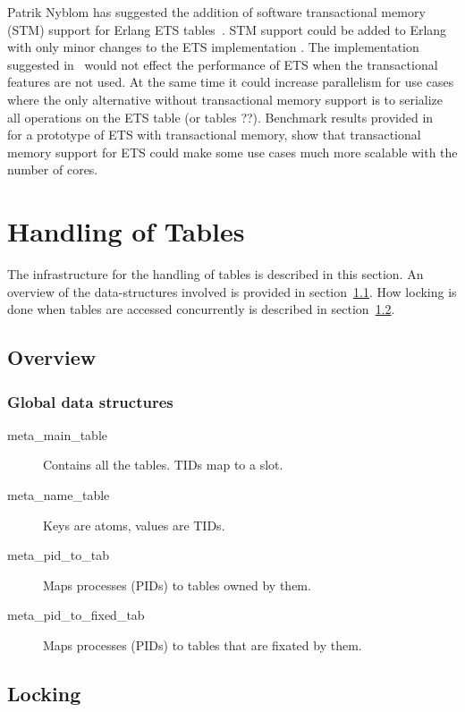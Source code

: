 \documentclass[aps,pre,preprint,nofootinbib]{revtex4}
\begin{document}
  Patrik Nyblom has suggested the addition of software transactional memory (STM) support for Erlang ETS tables~\cite{PatrikErlangTrans}.
  STM support could be added to Erlang with only minor changes to the ETS implementation \cite{PatrikErlangTrans}.
  The implementation suggested in~\cite{PatrikErlangTrans} would not effect the performance of ETS when the transactional features are not used.
  At the same time it could increase parallelism for use cases where the only alternative without transactional memory support is to serialize all operations on the ETS table (or tables ??).
  Benchmark results provided in~\cite{PatrikErlangTrans} for a prototype of ETS with transactional memory, show that transactional memory support for ETS could make some use cases much more scalable with the number of cores.
  

\section{Handling of Tables}

The infrastructure for the handling of tables is described in this section. 
An overview of the data-structures involved is provided in section~\ref{sec:tables_overview}.
How locking is done when tables are accessed concurrently is described in section~\ref{sec:tables_locking}.

\subsection{Overview} \label{sec:tables_overview}

\subsubsection{Global data structures}

\begin{description}
  \item[meta\_main\_table] Contains all the tables. TIDs map to a slot.
  \item[meta\_name\_table] Keys are atoms, values are TIDs.
  \item[meta\_pid\_to\_tab] Maps processes (PIDs) to tables owned by them.
  \item[meta\_pid\_to\_fixed\_tab] Maps processes (PIDs) to tables that are
    fixated by them.
\end{description}

\subsection{Locking} \label{sec:tables_locking}
\end{document}
